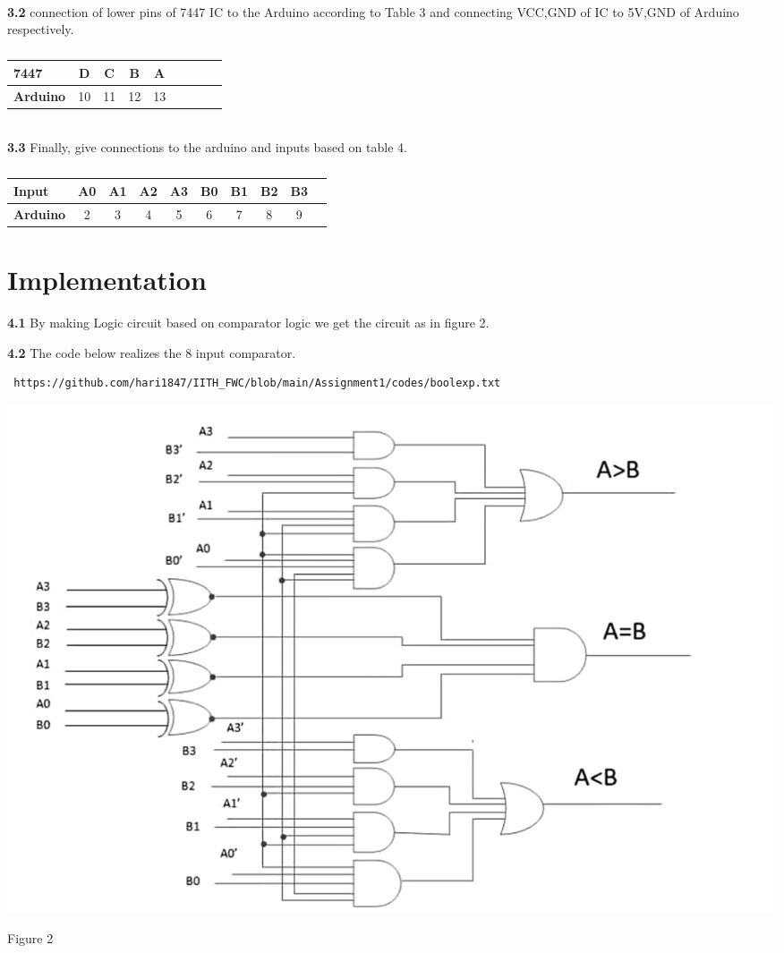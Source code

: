 \documentclass[10pt, a4paper]{article}
\begin{document}
\\	\textbf{3.2}
	connection of lower pins of 7447 IC to the Arduino according to Table 3 and connecting VCC,GND of IC to 5V,GND of Arduino respectively.
		\begin{table}[htbp]
    \begin{center}
    \begin{tabular}{|l|c|c|c|c|c|c|c|c} \hline \textbf{7447}
  & D & C & B & A \\
 \hline
\textbf{Arduino} & 10 & 11 & 12& 13\\ \hline
\end{tabular}   
\end{center}
\caption{\label{table:dummytable} }
\end{table}
\\\textbf{3.3}
Finally, give connections to the arduino and inputs based on table 4.
	\begin{table}[htbp]
    \begin{center}
    \begin{tabular}{|l|c|c|c|c|c|c|c|c|c|} \hline 
 
\textbf{Input} & A0 & A1 & A2 & A3 & B0 & B1 & B2&B3 \\ \hline
\textbf{Arduino} & 2 & 3 & 4 & 5& 6 & 7 & 8 & 9\\ \hline
\end{tabular}   
\end{center}
\caption{\label{table:dummytable} }
\end{table}
\section{Implementation}
\textbf{4.1}
By making Logic circuit based on comparator logic we get the circuit as in figure 2.

\textbf{4.2}
The code below realizes the 8 input comparator.
\begin{lstlisting}
 https://github.com/hari1847/IITH_FWC/blob/main/Assignment1/codes/boolexp.txt
\end{lstlisting}



 \begin{center}
\includegraphics[scale=.10]{circuit.jpeg}

\end{center}
\begin{center}
    Figure 2
\end{center}
\end{document}
